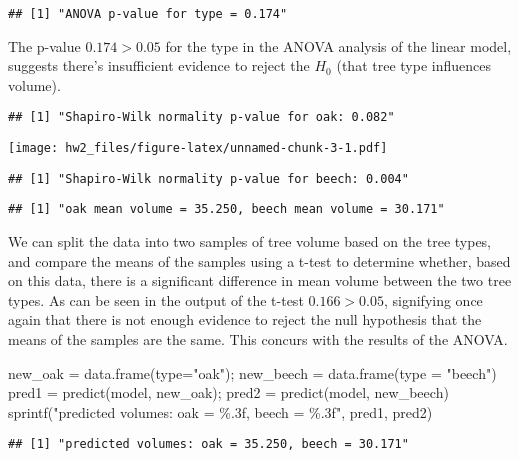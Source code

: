 \documentclass[
  11pt,
]{article}
\newenvironment{Shaded}{\begin{snugshade}}{\end{snugshade}}
\newcommand{\AttributeTok}[1]{\textcolor[rgb]{0.77,0.63,0.00}{#1}}
\newcommand{\FunctionTok}[1]{\textcolor[rgb]{0.00,0.00,0.00}{#1}}
\newcommand{\NormalTok}[1]{#1}
\newcommand{\OtherTok}[1]{\textcolor[rgb]{0.56,0.35,0.01}{#1}}
\newcommand{\StringTok}[1]{\textcolor[rgb]{0.31,0.60,0.02}{#1}}
\begin{document}
\begin{verbatim}
## [1] "ANOVA p-value for type = 0.174"
\end{verbatim}

The p-value \(0.174>0.05\) for the type in the ANOVA analysis of the
linear model, suggests there's insufficient evidence to reject the
\(H_0\) (that tree type influences volume).

\begin{verbatim}
## [1] "Shapiro-Wilk normality p-value for oak: 0.082"
\end{verbatim}

\texttt{[image: hw2\_files/figure-latex/unnamed-chunk-3-1.pdf]}

\begin{verbatim}
## [1] "Shapiro-Wilk normality p-value for beech: 0.004"
\end{verbatim}

\begin{verbatim}
## [1] "oak mean volume = 35.250, beech mean volume = 30.171"
\end{verbatim}

We can split the data into two samples of tree volume based on the tree
types, and compare the means of the samples using a t-test to determine
whether, based on this data, there is a significant difference in mean
volume between the two tree types. As can be seen in the output of the
t-test \(0.166 > 0.05\), signifying once again that there is not enough
evidence to reject the null hypothesis that the means of the samples are
the same. This concurs with the results of the ANOVA.

\begin{Shaded}
\begin{Highlighting}[]
\NormalTok{new\_oak }\OtherTok{=} \FunctionTok{data.frame}\NormalTok{(}\AttributeTok{type=}\StringTok{"oak"}\NormalTok{); new\_beech }\OtherTok{=} \FunctionTok{data.frame}\NormalTok{(}\AttributeTok{type =} \StringTok{"beech"}\NormalTok{)}
\NormalTok{pred1 }\OtherTok{=} \FunctionTok{predict}\NormalTok{(model, new\_oak); pred2 }\OtherTok{=} \FunctionTok{predict}\NormalTok{(model, new\_beech)}
\FunctionTok{sprintf}\NormalTok{(}\StringTok{"predicted volumes: oak = \%.3f, beech = \%.3f"}\NormalTok{, pred1, pred2)}
\end{Highlighting}
\end{Shaded}

\begin{verbatim}
## [1] "predicted volumes: oak = 35.250, beech = 30.171"
\end{verbatim}
\end{document}
